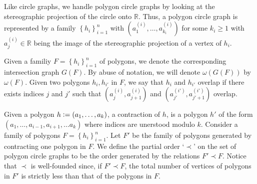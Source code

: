 \documentclass[12pt]{article}
\theoremstyle{definition}
\newcommand{\defeq}{\vcentcolon=}
\begin{document}
    Like circle graphs, we
    handle polygon
    circle graphs by looking
    at the stereographic projection
    of the circle onto $\mathbb{R}$.
    Thus, a polygon circle
    graph is represented by a 
    family $\left\{h_{i}\right\}_{i=1}^{n}$
    with 
    $\left(a_{1}^{\left(i\right)},
    \ldots, a_{k_{i}}^{\left(i\right)}\right)$ 
    for some $k_{i} \geq 1$ 
    with $a^{\left(i\right)}_{j} \in \mathbb{R}$
    being the image of
    the stereographic projection
    of a vertex of $h_{i}$.

    Given a familiy
    $F = \left\{h_{i}\right\}_{i=1}^{n}$ 
    of polygons, we denote
    the corresponding
    intersection graph $G\left(F\right)$.
    By abuse of notation,
    we will denote
    $\omega\left(G\left(F\right)\right)$ 
    by $\omega\left(F\right)$.
    Given two polygons
    $h_{i}, h_{i'}$ in $F$,
    we say that $h_{i}$ and
    $h_{i'}$ overlap 
    if there exists indices 
    $j$ and $j'$ such that
    $\left(a_{j}^{\left(i\right)},
     a_{j+1}^{\left(i\right)}\right)$ 
     and $\left(a_{j'}^{\left(i'\right)},
     a_{j'+1}^{\left(i'\right)}\right)$ 
     overlap.

     Given a polygon
     $h \defeq \left(
     a_{1}, \ldots, a_{k}\right)$,
     a contraction of $h$,
     is a polygon $h'$ 
     of the form
     $\left(a_{1}, \ldots,
     a_{i-1}, a_{i+1}, \ldots
     a_{k}\right)$ 
     where indices are
     unerstood modulo $k$.
     Consider a family of
     polygons
     $F = \left\{h_{i}\right\}_{i=1}^{n}$.
     Let $F'$ be the family
     of polygons generated
     by contracting one
     polygon in $F$.
     We define the partial order
     `$\prec$' on the set
     of polygon circle graphs
     to be the order generated
     by the relations $F' \prec F$.
     Notice that $\prec$ is
     well-founded since,
     if $F' \prec F$,
     the total number of 
     vertices of polygons in
     $F'$ is strictly less than
     that of the polygons in $F$.
\end{document}
